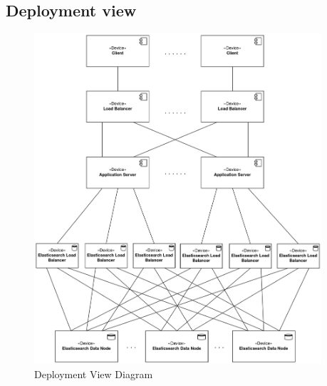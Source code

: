 \documentclass[11pt,twoside]{article}
\begin{document}
	\subsection{Deployment view}
\begin{figure}[H]
\centering
\includegraphics[width=0.95\textwidth]{Images/Deployment_view}
\caption{Deployment View Diagram}\label{Deployment_view}
\end{figure}

\newpage
\end{document}
